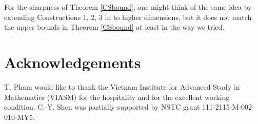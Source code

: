 \documentclass[11pt]{article}
\newcommand{\1}{\mathbf{1}}
\begin{document}
For the sharpness of Theorem \ref{CSbound}, one might think of the same idea by extending Constructions 1, 2, 3 in \cite{FuRen} to higher dimensions, but it does not match the upper bounds in Theorem \ref{CSbound} at least in the way we tried.


\section{Acknowledgements}
T. Pham would like to thank the Vietnam Institute for Advanced Study in Mathematics (VIASM) for the hospitality and for the excellent working condition. C.-Y. Shen was partially supported by NSTC grant 111-2115-M-002-010-MY5.
\end{document}
